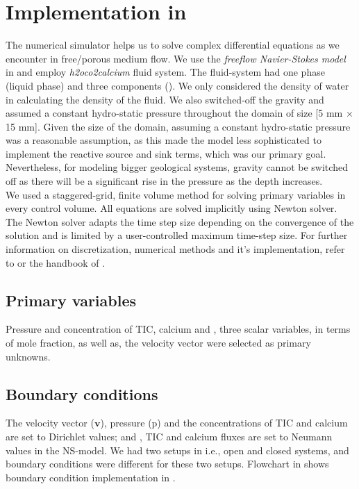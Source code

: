 \section{Implementation in \DuMuX}\label{ssec:impdum}
The numerical simulator \DuMuX helps us to solve complex differential equations as we encounter in free/porous medium flow. 
We use the \textit{freeflow Navier-Stokes model} in \DuMuX and employ \textit{h2oco2calcium} fluid system. 
The fluid-system had one phase (liquid phase) and three components (). We only considered the density 
of water in calculating the density of the fluid. We also switched-off the gravity and assumed a constant hydro-static pressure 
throughout the domain of size [5 mm $\times$ 15 mm]. Given the size of the domain, assuming a constant hydro-static pressure was 
a reasonable assumption, as this made the model less sophisticated to implement the reactive source and sink terms, which was our 
primary goal. Nevertheless, for modeling bigger geological systems, gravity cannot be switched off as there 
will be a significant rise in the pressure as the depth increases.\\
We used a staggered-grid, finite volume method for solving primary variables in every control volume. 
All equations are solved implicitly using Newton solver. The Newton solver adapts 
the time step size depending on the convergence of the solution and is limited by a user-controlled maximum time-step size. 
For further information on discretization, numerical methods and it's implementation, refer to \cite{Koch2020} or the handbook 
of \DuMuX \cite{Kochetal2020Dumux}.

\subsection{Primary variables} Pressure and concentration  of TIC, calcium and , three scalar variables, in 
terms of mole fraction, as well as, the velocity vector were selected as primary unknowns. 

\subsection{Boundary conditions} 
The velocity vector ($\mathbf{v}$), pressure (p) and the concentrations of TIC and calcium are set to Dirichlet values; 
and , TIC and calcium fluxes are set to Neumann values in the NS-model. We had two setups in \DuMuX i.e., open 
and closed systems, and boundary conditions were different for these two setups. Flowchart in  shows boundary 
condition implementation in \DuMuX. 

